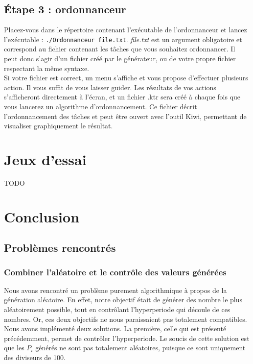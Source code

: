 		
	\section{Étape 3 : ordonnanceur}
	
		Placez-vous dans le répertoire contenant l'exécutable de l'ordonnanceur et lancez l'exécutable : \verb+./Ordonnanceur file.txt+. \emph{file.txt} est un argument obligatoire et correspond au fichier contenant les tâches que vous souhaitez ordonnancer. Il peut donc s'agir d'un fichier créé par le générateur, ou de votre propre fichier respectant la même syntaxe.\\
		
		Si votre fichier est correct, un menu s'affiche et vous propose d'effectuer plusieurs action. Il vous suffit de vous laisser guider. Les résultats de vos actions s'afficheront directement à l'écran, et un fichier .ktr sera créé à chaque fois que vous lancerez un algorithme d'ordonnancement. Ce fichier décrit l'ordonnancement des tâches et peut être ouvert avec l'outil Kiwi, permettant de visualiser graphiquement le résultat.


\chapter{Jeux d'essai}
{\Huge TODO }


\chapter{Conclusion}
	\section{Problèmes rencontrés}
		\subsection{Combiner l'aléatoire et le contrôle des valeurs générées}
			\label{sec:pb_aleatoire}
			Nous avons rencontré un problème purement algorithmique à propos de la génération aléatoire. En effet, notre objectif était de générer des nombre le plus aléatoirement possible, tout en contrôlant l'hyperperiode qui découle de ces nombres. Or, ces deux objectifs ne nous paraissaient pas totalement compatibles.\\
		
			Nous avons implémenté deux solutions. La première, celle qui est présenté précédemment, permet de contrôler l'hyperperiode. Le soucis de cette solution est que les $P_i$ générés ne sont pas totalement aléatoires, puisque ce sont uniquement des diviseurs de 100.\\
		
